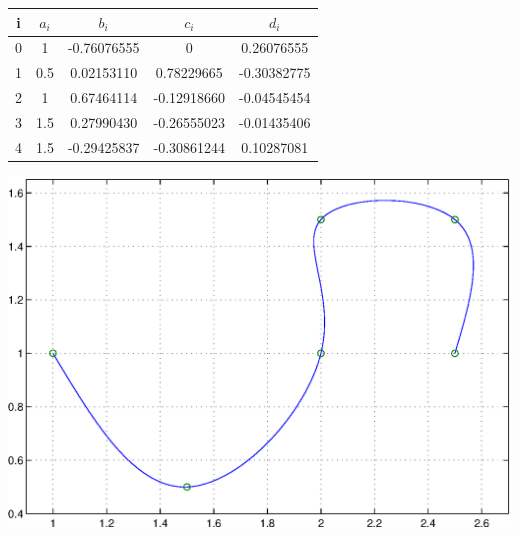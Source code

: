 \documentclass[paper=a4, fontsize=11pt]{scrartcl} %
\numberwithin{equation}{section} %
\numberwithin{figure}{section} %
\numberwithin{table}{section} %
\begin{document}
\begin{center}
  \begin{tabular}{ c || c | c | c | c }
    i & $a_i$ & $b_i$ & $c_i$ & $d_i$\\ \hline
    0 & 1   &-0.76076555 & 0          & 0.26076555 \\ \hline
    1 & 0.5 & 0.02153110 & 0.78229665 &-0.30382775 \\ \hline
    2 & 1   & 0.67464114 &-0.12918660 &-0.04545454 \\ \hline
    3 & 1.5 & 0.27990430 &-0.26555023 &-0.01435406 \\ \hline
    4 & 1.5 &-0.29425837 &-0.30861244 & 0.10287081 \\
    \hline
  \end{tabular}
\end{center}


\includegraphics [scale=0.8] {myfig.eps}



\bigskip
\bigskip
\bigskip
\bigskip
\bigskip
\bigskip
\bigskip
\bigskip
\bigskip
\bigskip
\bigskip
\bigskip
\bigskip

\section{}
\end{document}
